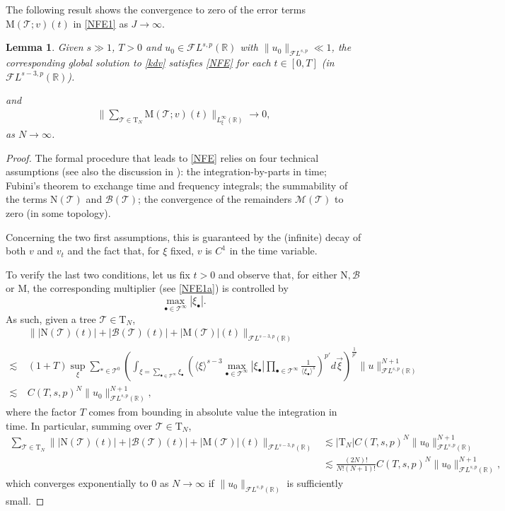 \documentclass[%
11pt,  reqno]{amsart}
\newcommand{\jap}[1]{\langle #1 \rangle}
\newcommand{\5}{\textup{V}}
\newcommand{\noi}{\noindent}
\newtheorem{lemma}[theorem]{Lemma}
\theoremstyle{remark}
\newcommand{\R}{\mathbb{R}}
\newcommand{\bul}{\bullet}
\newcommand{\TT}{\mathcal{T}}
\newcommand{\Tr}{\mathrm{T}}
\newcommand{\B}{\mathcal{B}}
\numberwithin{equation}{section}
\numberwithin{theorem}{section}
\newcommand{\MM}{\mathrm{M}}
\newcommand{\NN}{\mathrm{N}}
\newcommand{\andreia}[1]{\marginpar{\color{purple} $\Leftarrow\Leftarrow\Leftarrow$}{\smallskip \noi\color{purple}ANDREIA: #1}\smallskip}
\begin{document}
\andreia{CHECK }

The following result shows the convergence to zero of the error terms  $\MM(\TT; v)(t)$ in \eqref{NFE1}  as $J\to\infty$. 

{
\color{blue}


\begin{lemma}
	Given $s\gg 1$, $T>0$ and $u_0\in \mathcal{F}L^{s,p}(\R)$ with $\|u_0\|_{\mathcal{F}L^{s,p}}\ll 1$, the corresponding global solution to \eqref{kdv} satisfies \eqref{NFE} for each $t\in [0,T]$ (in $\mathcal{F}L^{s-3,p}(\R)$). 

    \color{red}
    and
\begin{align}
\bigg\| \sum_{\TT\in \Tr_N} \MM(\TT; v ) (t) \bigg\|_{ L^{\infty}_\xi (\R) } \to 0 , 
\end{align}
as $N\to\infty$. 

\end{lemma}
\begin{proof}
	The formal procedure that leads to \eqref{NFE} relies on four technical assumptions (see also the discussion in \cite[PÁGINA]{KOY}): the integration-by-parts in time; Fubini's theorem to exchange time and frequency integrals; the summability of the terms $\NN(\TT)$ and $\B(\TT)$; the convergence of the remainders $\mathcal{M}(\TT)$ to zero (in some topology).
	
	Concerning the two first assumptions, this is guaranteed by the (infinite) decay of both $v$ and $v_t$ and the fact that, for $\xi$ fixed, $v$ is $C^1$ in the time variable.
	
	To verify the last two conditions, let us fix $t>0$ and observe that, for either $\NN, \B$ or $\MM$, the corresponding multiplier (see \eqref{NFE1a}) is controlled by 
	$$\max_{\bul\in \TT^\infty}|\xi_\bul|.
	$$ As such, given a tree $\TT\in \Tr_N$,
	\begin{align*}
	&\||\NN(\TT)(t)| + |\B(\TT)(t)| + |\MM(\TT)|(t)\|_{\mathcal{F}L^{s-3,p}(\R)}\\\lesssim\ & (1+T)\sup_\xi\sum_{\ast \in \TT^0} \left( \int_{\xi=\sum_{\bul\in\TT^\infty}\xi_\bul} \left({\jap{\xi}^{s-3}\max_{\bul\in \TT^\infty}|\xi_\bul|}\prod_{{\bul\in \TT^\infty}} \frac{1}{\jap{\xi_\bul}^{s}}\right)^{p'} d\vec{\xi} \right)^{\frac{1}{p'}}\|u\|_{\mathcal{F}L^{s,p}(\R)}^{N+1}\\\lesssim\ & C(T,s,p)^N\|u_0\|_{\mathcal{F}L^{s,p}(\R)}^{N+1},
	\end{align*}
	where the factor $T$ comes from bounding in absolute value the integration in time. In particular, summing over $\TT\in \Tr_N$,
\begin{align*}
		\sum_{\TT\in \Tr_N} \||\NN(\TT)(t)| + |\B(\TT)(t)| + |\MM(\TT)|(t)\|_{\mathcal{F}L^{s-3,p}(\R)} &\lesssim |\Tr_N|C(T,s,p)^N\|u_0\|_{\mathcal{F}L^{s,p}(\R)}^{N+1}\\&\lesssim \frac{(2N)!}{N!(N+1)!}C(T,s,p)^N\|u_0\|_{\mathcal{F}L^{s,p}(\R)}^{N+1},
\end{align*}
	which converges exponentially to 0 as $N\to \infty$ if $\|u_0\|_{\mathcal{F}L^{s,p}(\R)}$ is sufficiently small.
\end{proof}




}
\end{document}
